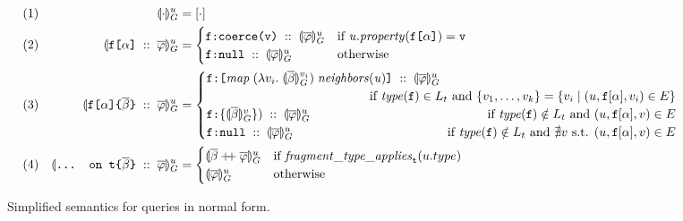 \begin{figure*}[t]
    \centering
    \begin{align*}
    & (1) & \seval{\cdot}{u} &= [\cdot] \\
    & (2) & \sevalu{\fld\; ::\; \queries} &= 
    \begin{cases}
      \resp{\texttt{coerce(\val)}} \; ::\; \sevalu{\queries}  
      & \text{if }\mathit{u.property}(\fld) = \val \\
      \resp{\nval} \; :: \; \sevalu{\queries} 
      & \text{otherwise}
    \end{cases}\\
    & (3) & %
    \sevalu{\nfld{\overline{\beta}} \; ::\; \queries} &=
    \begin{cases}
      \resp{\texttt{[} \mathit{map}\; (\lambda v_{i}.\; \seval{\overline{\beta}}{v_{i}})\; 
      \mathit{neighbors(u)} \texttt{]}} \; :: \; \sevalu{\queries}  \\
      \hfill \text{ if } 
        \mathit{type(\fkey)} \in L_{t} 
          \text{ and } \{v_{1}, \ldots, v_{k}\} = \{v_{i} \mid (u, \fkey[\alpha], 
        v_{i}) \in E\} \\
      \resp{\{\seval{\subqueries{\beta}}{v}\})} \; :: \; \sevalu{\queries}  
      \hfill \text{ if } 
        \mathit{type(\fkey)} \notin L_{t} 
        \text{ and } (u, \fkey[\alpha], v) \in E \\
      \resp{\nval} \; :: \; \sevalu{\queries} 
      \qquad \qquad \qquad \qquad \qquad \qquad
      \text{ if } \mathit{type(\fkey)} \notin L_{t} 
        \text{ and } \nexists v \text{ s.t. } (u, \fkey[\alpha], v) \in E \\
    \end{cases}\\
    & (4) & \sevalu{\ifrag{t}{\overline{\beta}}\; ::\; \queries} &= \begin{cases}
    \sevalu{\overline{\beta} \mdoubleplus \queries} & 
    \text{if }\mathit{fragment\_type\_applies}_{\texttt{t}}(u.type)\\
    \sevalu{\queries} & \text{otherwise}
    \end{cases}
    \end{align*}
    \caption{Simplified semantics for queries in normal form.} 
    \label{fig:simpl_semantics}
\end{figure*}

